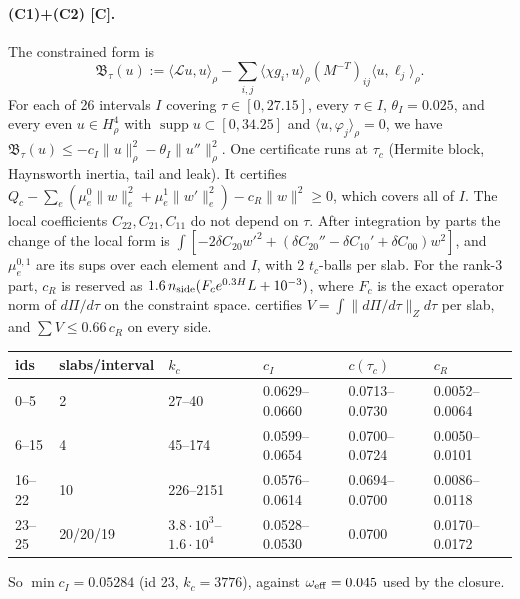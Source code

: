 \documentclass[11pt]{article}
\theoremstyle{definition}
\theoremstyle{remark}
\newcommand{\fn}[1]{\texttt{\detokenize{#1}}}
\newcommand{\tC}{\textnormal{\textsc{[C]}}}
\newcommand{\ip}[2]{\langle #1,#2\rangle}
\newcommand{\norm}[1]{\lVert #1\rVert}
\newcommand{\cL}{\mathcal L}
\newcommand{\cB}{\mathfrak B}
\begin{document}
\paragraph{(C1)+(C2) \tC.} The constrained form is
\[
\cB_\tau(u):=\ip{\cL u}u_\rho-\sum_{i,j}\ip{\chi g_i}u_\rho(M^{-T})_{ij}\ip u{\ell_j}_\rho .
\]
For each of 26 intervals $I$ covering $\tau\in[0,27.15]$, every $\tau\in I$, $\theta_I=0.025$, and every even $u\in H^4_\rho$ with $\operatorname{supp}u\subset[0,34.25]$ and $\ip u{\varphi_j}_\rho=0$, we have $\cB_\tau(u)\le-c_I\norm u_\rho^2-\theta_I\norm{u''}_\rho^2$. One certificate runs at $\tau_c$ (Hermite block, Haynsworth inertia, tail and leak). It certifies $Q_c-\sum_e(\mu^0_e\norm w_e^2+\mu^1_e\norm{w'}_e^2)-c_R\norm w^2\ge0$, which covers all of $I$. The local coefficients $C_{22},C_{21},C_{11}$ do not depend on $\tau$. After integration by parts the change of the local form is $\int[-2\delta C_{20}w'^2+(\delta C_{20}''-\delta C_{10}'+\delta C_{00})w^2]$, and $\mu^{0,1}_e$ are its sups over each element and $I$, with 2 $t_c$-balls per slab. For the rank-3 part, $c_R$ is reserved as $1.6\,n_{\rm side}(F_ce^{0.3H}L+10^{-3})$, where $F_c$ is the exact operator norm of $d\Pi/d\tau$ on the constraint space. \fn{c2r3.py} certifies $V=\int\norm{d\Pi/d\tau}_Zd\tau$ per slab, and $\sum V\le0.66\,c_R$ on every side.
\begin{center}\small\begin{tabular}{@{}llllll@{}}\toprule
ids & slabs/interval & $k_c$ & $c_I$ & $c(\tau_c)$ & $c_R$\\\midrule
0--5 & 2 & 27--40 & 0.0629--0.0660 & 0.0713--0.0730 & 0.0052--0.0064\\
6--15 & 4 & 45--174 & 0.0599--0.0654 & 0.0700--0.0724 & 0.0050--0.0101\\
16--22 & 10 & 226--2151 & 0.0576--0.0614 & 0.0694--0.0700 & 0.0086--0.0118\\
23--25 & 20/20/19 & $3.8\cdot10^3$--$1.6\cdot10^4$ & 0.0528--0.0530 & 0.0700 & 0.0170--0.0172\\\bottomrule\end{tabular}\end{center}
So $\min c_I=0.05284$ (id 23, $k_c=3776$), against $\omega_{\rm eff}=0.045$ used by the closure.
\end{document}

